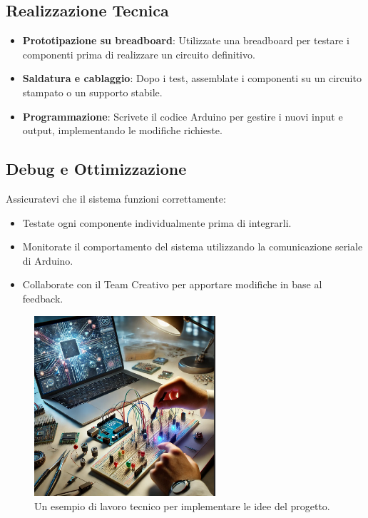 \documentclass[a4paper,12pt]{report}
\begin{document}
\subsection{Realizzazione Tecnica}
\begin{itemize}
    \item \textbf{Prototipazione su breadboard}: Utilizzate una breadboard per testare i componenti prima di realizzare un circuito definitivo.
    \item \textbf{Saldatura e cablaggio}: Dopo i test, assemblate i componenti su un circuito stampato o un supporto stabile.
    \item \textbf{Programmazione}: Scrivete il codice Arduino per gestire i nuovi input e output, implementando le modifiche richieste.
\end{itemize}

\subsection{Debug e Ottimizzazione}
Assicuratevi che il sistema funzioni correttamente:
\begin{itemize}
    \item Testate ogni componente individualmente prima di integrarli.
    \item Monitorate il comportamento del sistema utilizzando la comunicazione seriale di Arduino.
    \item Collaborate con il Team Creativo per apportare modifiche in base al feedback.
\end{itemize}

\begin{figure}[ht!]
    \centering
    \includegraphics[width=0.6\textwidth]{tecnici.png}
    \caption{Un esempio di lavoro tecnico per implementare le idee del progetto.}
    \label{fig:tecnici}
\end{figure}
\end{document}
